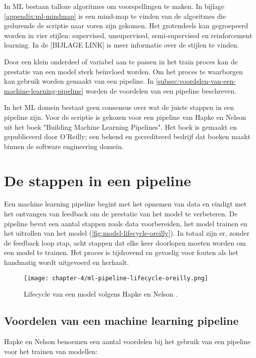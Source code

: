 In ML bestaan talloze algoritmes om voorspellingen te maken. In bijlage \ref{appendix:ml-mindmap} is een mind-map te vinden van de algoritmes die gedurende de scriptie naar voren zijn gekomen. Het grotendeels kan gegroepeerd worden in vier stijlen: supervised, unsupervised, semi-supervised en reinforcement learning. In de [BIJLAGE LINK] is meer informatie over de stijlen te vinden.

Door een klein onderdeel of variabel aan te passen in het train proces kan de prestatie van een model sterk beïnvloed worden. Om het proces te waarborgen kan gebruik worden gemaakt van een pipeline. In \autoref{subsec:voordelen-van-een-machine-learning-pipeline} worden de voordelen van een pipeline beschreven.

In het ML domein bestaat geen consensus over wat de juiste stappen in een pipeline zijn. Voor de scriptie is gekozen voor een pipeline van Hapke en Nelson uit het boek "Building Machine Learning Pipelines". Het boek is gemaakt en gepubliceerd door O'Reilly; een bekend en gecrediteerd bedrijf dat boeken maakt binnen de software engineering domein.

\section{De stappen in een pipeline}\label{sec:stappen-in-een-pipeline}
Een machine learning pipeline begint met het opnemen van data en eindigt met het ontvangen van feedback om de prestatie van het model te verbeteren. De pipeline bevat een aantal stappen zoals data voorbereiden, het model trainen en het uitrollen van het model (\autoref{fig:model-lifecycle-oreilly}). In totaal zijn er, zonder de feedback loop stap, acht stappen dat elke keer doorlopen moeten worden om een model te trainen. Het proces is tijdrovend en gevoelig voor fouten als het handmatig wordt uitgevoerd en herhaalt.

\begin{figure}[hbt!]
  \centering
  \texttt{[image: chapter-4/ml-pipeline-lifecycle-oreilly.png]}
  \caption{Lifecycle van een model volgens Hapke en Nelson \cite[p.~4]{building-machine-learning-pipelines-oreilly}.}
  \label{fig:model-lifecycle-oreilly}
\end{figure}

\subsection{Voordelen van een machine learning pipeline}\label{subsec:voordelen-van-een-machine-learning-pipeline}
Hapke en Nelson \cite{building-machine-learning-pipelines-oreilly} benoemen een aantal voordelen bij het gebruik van een pipeline voor het trainen van modellen:

